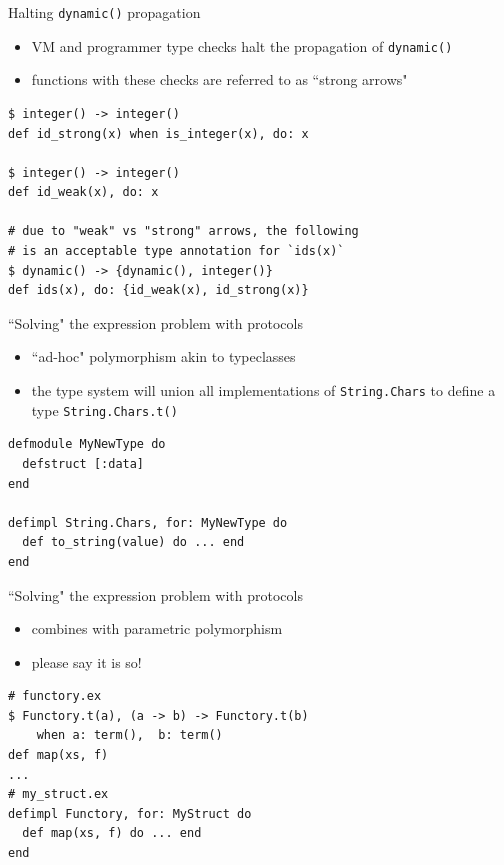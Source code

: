 \documentclass[
  ignorenonframetext,
  aspectratio=169]{beamer}
\newcommand{\passthrough}[1]{#1}
\providecommand{\tightlist}{%
  \setlength{\itemsep}{0pt}\setlength{\parskip}{0pt}}
\begin{document}
\begin{frame}[fragile]{Halting \passthrough{\lstinline!dynamic()!}
propagation}
\label{halting-dynamic-propagation}
\begin{itemize}
\tightlist
\item
  VM and programmer type checks halt the propagation of
  \passthrough{\lstinline!dynamic()!}
\item
  functions with these checks are referred to as ``strong arrows"
\end{itemize}

\begin{lstlisting}
$ integer() -> integer()
def id_strong(x) when is_integer(x), do: x

$ integer() -> integer()
def id_weak(x), do: x

# due to "weak" vs "strong" arrows, the following
# is an acceptable type annotation for `ids(x)`
$ dynamic() -> {dynamic(), integer()}
def ids(x), do: {id_weak(x), id_strong(x)}
\end{lstlisting}
\end{frame}

\begin{frame}[fragile]{``Solving" the expression problem with protocols}
\label{solving-the-expression-problem-with-protocols}
\begin{itemize}
\tightlist
\item
  ``ad-hoc" polymorphism akin to typeclasses
\item
  the type system will union all implementations of
  \passthrough{\lstinline!String.Chars!} to define a type
  \passthrough{\lstinline!String.Chars.t()!}
\end{itemize}

\begin{lstlisting}
defmodule MyNewType do
  defstruct [:data]
end

defimpl String.Chars, for: MyNewType do
  def to_string(value) do ... end
end
\end{lstlisting}
\end{frame}

\begin{frame}[fragile]{``Solving" the expression problem with protocols}
\label{solving-the-expression-problem-with-protocols-1}
\begin{itemize}
\tightlist
\item
  combines with parametric polymorphism
\item
  please say it is so!
\end{itemize}

\begin{lstlisting}
# functory.ex
$ Functory.t(a), (a -> b) -> Functory.t(b)
    when a: term(),  b: term()
def map(xs, f)
...
# my_struct.ex
defimpl Functory, for: MyStruct do
  def map(xs, f) do ... end
end
\end{lstlisting}
\end{frame}
\end{document}

